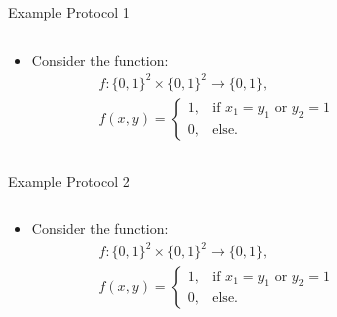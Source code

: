 \documentclass{beamer}
\begin{document}
\begin{frame}{Example Protocol 1}
\begin{columns}
\begin{column}{.65\textwidth}   
\begin{itemize}
    \item Consider the function: 
        \begin{align*}
            &f: \{0, 1\}^2 \times \{0, 1\}^2 \to \{0, 1\},\\
            &f(x, y) = \left\lbrace
                \begin{array}{cl}
                1, & \text{if } x_1 = y_1 \text{ or } y_2 = 1\\ 
                0, & \text{else.}
                \end{array} 
            \right.
        \end{align*}
\end{itemize}
\end{column}
\begin{column}{.3\textwidth}
\begin{overlayarea}{\textwidth}{.45\textheight}
{}
\end{overlayarea}
\end{column}
\end{columns}
\end{frame}

\begin{frame}[t]{Example Protocol 2}
\begin{columns}[T]
\begin{column}{.65\textwidth}   
\begin{itemize}
    \item Consider the function: 
        \begin{align*}
            &f: \{0, 1\}^2 \times \{0, 1\}^2 \to \{0, 1\},\\
            &f(x, y) = \left\lbrace
                \begin{array}{cl}
                1, & \text{if } x_1 = y_1 \text{ or } y_2 = 1\\ 
                0, & \text{else.}
                \end{array} 
            \right.
        \end{align*}
\end{itemize}
\end{column}
\begin{column}{.3\textwidth}
{}
\end{column}
\end{columns}
\end{frame}
\end{document}
